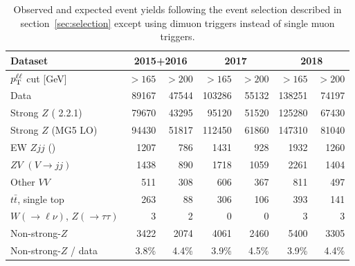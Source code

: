 \begin{table}[h]
  \centering
  \begin{tabular}{l|r|r|r|r|r|r|}\hline\hline
    Dataset   & \multicolumn{2}{c|}{2015+2016} & \multicolumn{2}{c|}{2017} & \multicolumn{2}{c|}{2018}\\ \hline
    $p_\mathrm{T}^{\ell\ell}$ cut [GeV] & $> 165$ & $> 200$ & $> 165$ & $ > 200$ & $> 165$ & $> 200$ \\ \hline\hline
    Data                            &  89167 &  47544 &  103286 &  55132 & 138251 & 74197 \\ \hline
    Strong $Z$ (\sherpa{} 2.2.1)    &  79670 &  43295 &   95120 &  51520 & 125280 & 67430 \\ 
    Strong $Z$ (MG5 LO)             &  94430 &  51817 &  112450 &  61860 & 147310 & 81040 \\ \hline
    EW $Zjj$ (\powpy{})             &   1207 &    786 &    1431 &    928 &   1932 &  1260 \\ 
    $ZV$ $(V\to jj)$                &   1438 &    890 &    1718 &   1059 &   2261 &  1404 \\  
    Other $VV$                      &    511 &    308 &     606 &    367 &    811 &   497 \\ 
    $t\bar{t}$, single top          &    263 &     88 &     306 &    106 &    393 &   141 \\ 
    $W(\to\ell\nu)$, $Z(\to\tau\tau)$ &    3 &      2 &       0 &      0 &      3 &     3 \\ \hline
    Non-strong-$Z$                  &  3422  &   2074 &    4061 &   2460 &   5400 &  3305 \\ \hline
    Non-strong-$Z$ / data           &  3.8\% &  4.4\% &   3.9\% &  4.5\% &  3.9\% & 4.4\% \\ \hline\hline
    \end{tabular}
    \caption{Observed and expected event yields following the event selection described in section~\ref{sec:selection} except using dimuon triggers instead of single muon triggers.}
    \label{tab:bkgProcesses}
\end{table}

